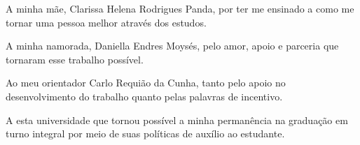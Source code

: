 \documentclass[
	12pt,				%
	openright,			%
	oneside,			%
	a4paper,			%
	english,			%
	french,				%
	spanish,			%
	brazil				%
	]{abntex2}
\begin{document}
\begin{agradecimentos}

A minha mãe, Clarissa Helena Rodrigues Panda, por ter me ensinado a como me tornar uma pessoa melhor através dos estudos.

A minha namorada, Daniella Endres Moysés, pelo amor, apoio e parceria que tornaram esse trabalho possível.

Ao meu orientador Carlo Requião da Cunha, tanto pelo apoio no desenvolvimento do trabalho quanto pelas palavras de incentivo.

A esta universidade que tornou possível a minha permanência na graduação em turno integral por meio de suas políticas de auxílio ao estudante.

\end{agradecimentos}

\end{document}
